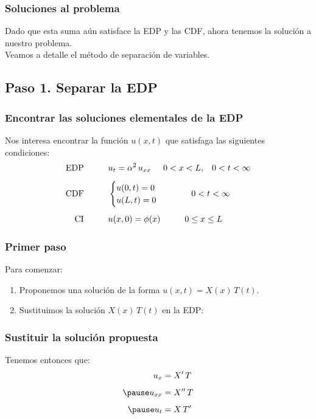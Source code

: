 \documentclass[12pt]{beamer}
\begin{document}
\begin{frame}
\frametitle{Soluciones al problema}
Dado que esta suma aún satisface la EDP y las CDF, ahora tenemos la solución a nuestro problema.
\\
\bigskip
\pause
Veamos a detalle el método de separación de variables.
\end{frame}

\subsection{Paso 1. Separar la EDP}

\begin{frame}
\frametitle{Encontrar las soluciones elementales de la EDP}
Nos interesa encontrar la función $u(x, t)$ que satisfaga las siguientes condiciones:
\begin{align*}
\mbox{EDP} \hspace{1cm} &u_{t} = \alpha^{2} \, u_{xx} \hspace{0.5cm} 0 < x < L, \hspace{0.3cm} 0 < t < \infty \\[0.5em] 
\mbox{CDF} \hspace{1cm} &\begin{cases}
    u (0, t) = 0 \\
    u (L, t) = 0
    \end{cases}
    \hspace{1cm}
    0 < t < \infty \\[0.5em]
\mbox{CI} \hspace{1cm} & u (x, 0) = \phi (x) \hspace{1cm} 0 \leq x \leq L
\end{align*}
\end{frame}
\begin{frame}
\frametitle{Primer paso}
Para comenzar:
\begin{enumerate}[<+->]
\item Proponemos una solución de la forma $u (x, t) = X(x) \, T (t)$.
\item Sustituimos la solución $X (x) \, T (t)$ en la EDP:
\seti
\end{enumerate}
\end{frame}
\begin{frame}
\frametitle{Sustituir la solución propuesta}
Tenemos entonces que:
\begin{eqnarray*}
\begin{aligned}
u_{x} &= \pderivada{X} \, T \\[0.5em] \pause
u_{xx} &= \sderivada{X} \, T \\[0.5em] \pause
u_{t} &= X \, \pderivada{T}
\end{aligned}
\end{eqnarray*}
\end{frame}
\end{document}
